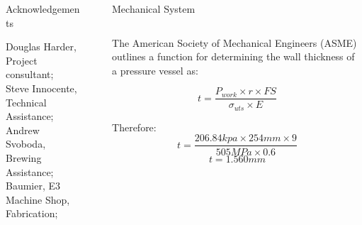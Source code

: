 \documentclass[final]{beamer}
\newlength{\sepwid}
\newlength{\onecolwid}
\newlength{\twocolwid}
\begin{document}
\begin{frame}[t]
\begin{columns}[t]
\begin{column}{\onecolwid}

\begin{alertblock}{Acknowledgements}

\small{Douglas Harder, Project consultant; \\
Steve Innocente, Technical Assistance; \\
Andrew Svoboda, Brewing Assistance; \\
Baumier, E3 Machine Shop, Fabrication;}

\end{alertblock}

\end{column} %

\begin{column}{\sepwid}\end{column} %

\begin{column}{\twocolwid} %

\begin{block}{Mechanical System} 
\end{block}

\begin{columns}[t,totalwidth=\twocolwid] %

\begin{column}{\onecolwid}\vspace{-.6in} %


The American Society of Mechanical Engineers (ASME) outlines a function for determining the wall thickness of a pressure vessel as:

\begin{equation}
t = \frac{P_{work} \times r \times FS}{\sigma_{uts} \times E}
\end{equation}

\noindent Therefore:
\begin{equation}
t = \frac{206.84kpa \times 254mm \times 9}{505MPa \times 0.6}
\end{equation}
\begin{equation}
t = 1.560mm
\end{equation}


\end{column}
\end{columns}
\end{column}
\end{columns}
\end{frame}
\end{document}
